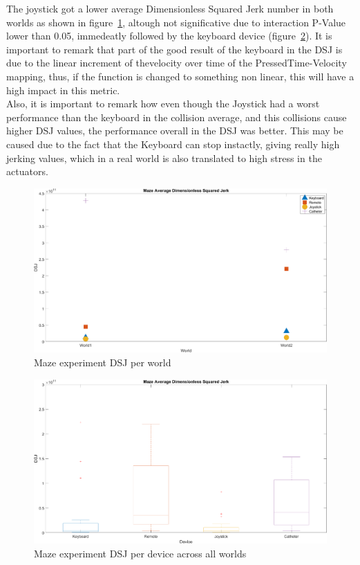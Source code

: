 The joystick got a lower average Dimensionless Squared Jerk number in both worlds as shown in figure~\ref{img:mazeAvgDsj}, altough not significative due to interaction P-Value lower than 0.05, immedeatly followed by the keyboard device (figure~\ref{img:mazeDsj}). It is important to remark that part of the good result of the keyboard in the DSJ is due to the linear increment of thevelocity over time of the PressedTime-Velocity mapping, thus, if the function is changed to something non linear, this will have a high impact in this metric.\\

Also, it is important to remark how even though the Joystick had a worst performance than the keyboard in the collision average, and this collisions cause higher DSJ values, the performance overall in the DSJ was better. This may be caused due to the fact that the Keyboard can stop instactly, giving really high jerking values, which in a real world is also translated to high stress in the actuators.\\

\begin{figure}[ht]
   \centering
   \includegraphics[width=1.0\textwidth]{img/maze/mazeAvgDsj.png}
   \caption{Maze experiment DSJ per world}
   \label{img:mazeAvgDsj}
\end{figure}

\begin{figure}[ht]
   \centering
   \includegraphics[width=1.0\textwidth]{img/maze/mazeDsj.png}
   \caption{Maze experiment DSJ per device across all worlds}
   \label{img:mazeDsj}
\end{figure}
\clearpage

